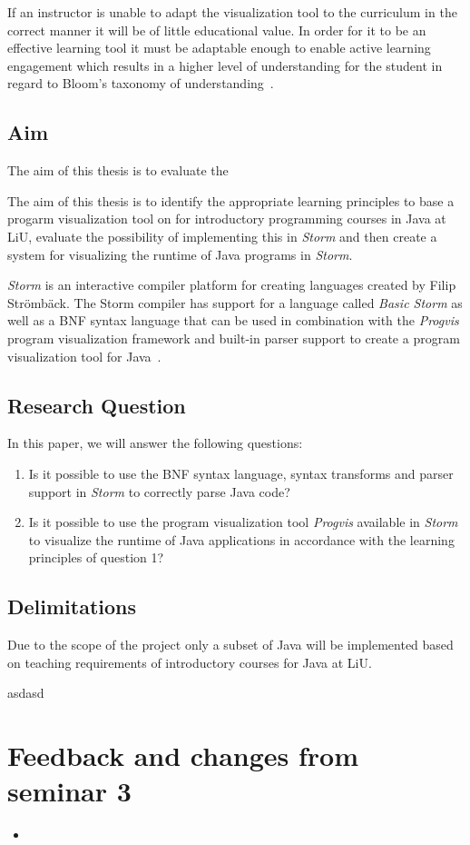 \documentclass{sigchi}
\begin{document}
If an instructor is unable to adapt the visualization tool to the curriculum in the correct manner it will be of little educational value. In order for it to be an effective learning tool it must be adaptable enough to enable active learning engagement which results in a higher level of understanding for the student in regard to Bloom's taxonomy of understanding~\cite{Naps:2002}. 

\subsection{Aim}
The aim of this thesis is to evaluate the 

The aim of this thesis is to identify the appropriate learning principles to base a progarm visualization tool on for introductory programming courses in Java at LiU, evaluate the possibility of implementing this in \emph{Storm} and then create a system for visualizing the runtime of Java programs in \emph{Storm}.

\emph{Storm} is an interactive compiler platform for creating languages created by Filip Strömbäck. The Storm compiler has support for a language called \emph{Basic Storm} as well as a BNF syntax language that can be used in combination with the \emph{Progvis} program visualization framework and built-in parser support to create a program visualization tool for Java~\cite{Stromback:2017,Stromback:2018,Storm:2023}.

\subsection{Research Question}
In this paper, we will answer the following questions:

\begin{enumerate}
\item Is it possible to use the BNF syntax language, syntax transforms and parser support in \emph{Storm} to correctly parse Java code?
\item Is it possible to use the program visualization tool \emph{Progvis} available in \emph{Storm} to visualize the runtime of Java applications in accordance with the learning principles of question 1?
\end{enumerate}

\subsection{Delimitations}
Due to the scope of the project only a subset of Java will be implemented based on teaching requirements of introductory courses for Java at LiU. 

asdasd



\balance{}




\newpage
\appendix{}
\section{Feedback and changes from seminar 3}


\begin{itemize}
\item 
\end{itemize}
\end{document}
